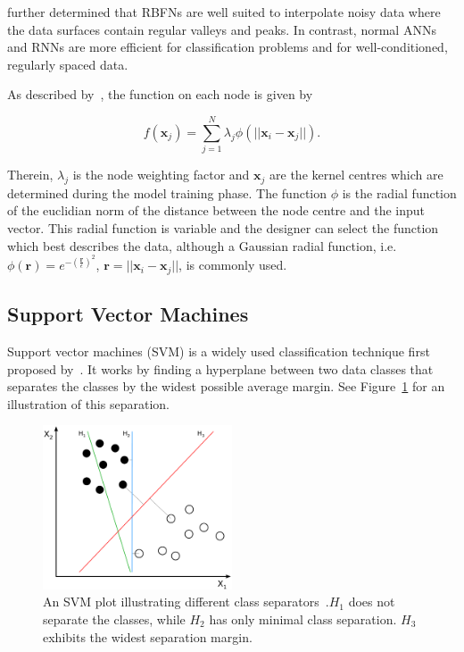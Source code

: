 \citeauthor{xie2011comparison} further determined that RBFNs are well suited to interpolate noisy data where the data surfaces contain regular valleys and peaks. In contrast, normal ANNs and RNNs are more efficient for classification problems and for well-conditioned, regularly spaced data. 

As described by~\cite{skala2012radial}, the function on each node is given by 

\begin{equation}
  \label{eq:chap2-rbf}
  f(\bm{x}_j) = \sum\limits_{j = 1}^{N}\lambda_j \phi(|| \bm{x}_i - \bm{x}_j ||).
\end{equation}

Therein, $\lambda_j$ is the node weighting factor and $\bm{x}_j$ are the kernel centres which are determined during the model training phase. The function $\phi$ is the radial function of the euclidian norm of the distance between the node centre and the input vector. This radial function is variable and the designer can select the function which best describes the data, although a Gaussian radial function, i.e.\ $\phi(\bm{r}) = e^{-(\frac{\bm{r}}{\epsilon})^2}$, $\bm{r} = || \bm{x}_i - \bm{x}_j ||$, is commonly used.  

\subsection{Support Vector Machines}

Support vector machines (SVM) is a widely used classification technique first proposed by~\cite{vapnik1995support}. It works by finding a hyperplane between two data classes that separates the classes by the widest possible average margin. See Figure~\ref{fig:chap2-svm-linear} for an illustration of this separation.

\begin{figure}
  \centering
  \includegraphics[width=0.5\textwidth]{figures/chapter2/svm_linear}
  \caption[SVM with linear hyperplane.]{An SVM plot illustrating different class separators~\citep{svm-wiki-pic}.\@ $H_1$ does not separate the classes, while $H_2$ has only minimal class separation. $H_3$ exhibits the widest separation margin.}
\label{fig:chap2-svm-linear}
\end{figure}


